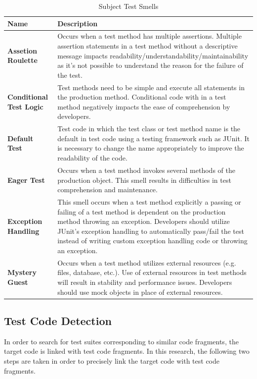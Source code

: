 \documentclass[conference]{IEEEtran}
\begin{document}
\begin{table}[t]
\caption{Subject Test Smells}
\label{smells}
\begin{tabular}{|l|p{14.5cm}|}
\hline
\textbf{Name}                   & \textbf{Description}                                                                                                       \\ \hline
\textbf{Assetion Roulette}        & Occurs when a test method has multiple assertions. Multiple assertion statements in a test method without a descriptive message impacts readability/understandability/maintainability as it’s not possible to understand the reason for the failure of the test.  \\ \hline
\textbf{Conditional Test Logic} & Test methods need to be simple and execute all statements in the production method. Conditional code with in a test method negatively impacts the ease of comprehension by developers.\\ \hline
\textbf{Default Test}            & Test code in which the test class or test method name is the default in test code using a testing framework such as JUnit. It is necessary to change the name appropriately to improve the readability of the code.                                                                                                      \\ \hline
\textbf{Eager Test }             & Occurs when a test method invokes several methods of the production object. This smell results in difficulties in test comprehension and maintenance. \\ \hline
\textbf{Exception Handling}      & This smell occurs when a test method explicitly a passing or failing of a test method is dependent on the production method throwing an exception. Developers should utilize JUnit's exception handling to automatically pass/fail the test instead of writing custom exception handling code or throwing an exception. \\ \hline
\textbf{Mystery Guest}          & Occurs when a test method utilizes external resources (e.g. files, database, etc.). Use of external resources in test methods will result in stability and performance issues. Developers should use mock objects in place of external resources. \\ \hline
\end{tabular}
\end{table}

\subsection{Test Code Detection}
In order to search for test suites corresponding to similar code fragments, the target code is linked with test code fragments. In this research, the following two steps are taken in order to precisely link the target code with test code fragments.
\end{document}
